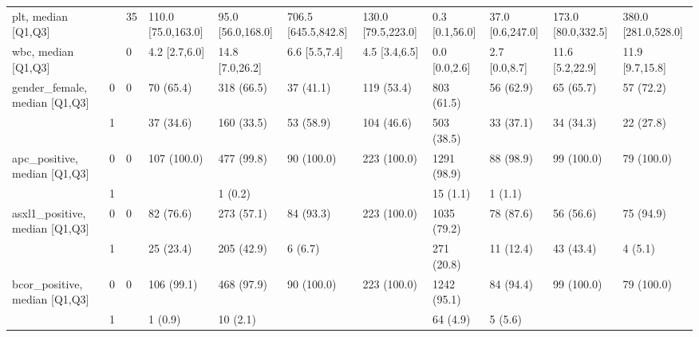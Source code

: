 \begin{tabular}{lllllllllll}
plt, median [Q1,Q3] &    &                   35 &  110.0 [75.0,163.0] &  95.0 [56.0,168.0] &  706.5 [645.5,842.8] &  130.0 [79.5,223.0] &    0.3 [0.1,56.0] &  37.0 [0.6,247.0] &  173.0 [80.0,332.5] &  380.0 [281.0,528.0] \\
wbc, median [Q1,Q3] &    &                    0 &       4.2 [2.7,6.0] &    14.8 [7.0,26.2] &        6.6 [5.5,7.4] &       4.5 [3.4,6.5] &     0.0 [0.0,2.6] &     2.7 [0.0,8.7] &     11.6 [5.2,22.9] &      11.9 [9.7,15.8] \\
gender\_female, median [Q1,Q3] & 0 &                    0 &           70 (65.4) &         318 (66.5) &            37 (41.1) &          119 (53.4) &        803 (61.5) &         56 (62.9) &           65 (65.7) &            57 (72.2) \\
                 & 1 &                      &           37 (34.6) &         160 (33.5) &            53 (58.9) &          104 (46.6) &        503 (38.5) &         33 (37.1) &           34 (34.3) &            22 (27.8) \\
apc\_positive, median [Q1,Q3] & 0 &                    0 &         107 (100.0) &         477 (99.8) &           90 (100.0) &         223 (100.0) &       1291 (98.9) &         88 (98.9) &          99 (100.0) &           79 (100.0) \\
                 & 1 &                      &                     &            1 (0.2) &                      &                     &          15 (1.1) &           1 (1.1) &                     &                      \\
asxl1\_positive, median [Q1,Q3] & 0 &                    0 &           82 (76.6) &         273 (57.1) &            84 (93.3) &         223 (100.0) &       1035 (79.2) &         78 (87.6) &           56 (56.6) &            75 (94.9) \\
                 & 1 &                      &           25 (23.4) &         205 (42.9) &              6 (6.7) &                     &        271 (20.8) &         11 (12.4) &           43 (43.4) &              4 (5.1) \\
bcor\_positive, median [Q1,Q3] & 0 &                    0 &          106 (99.1) &         468 (97.9) &           90 (100.0) &         223 (100.0) &       1242 (95.1) &         84 (94.4) &          99 (100.0) &           79 (100.0) \\
                 & 1 &                      &             1 (0.9) &           10 (2.1) &                      &                     &          64 (4.9) &           5 (5.6) &                     &                      \\

\end{tabular}
